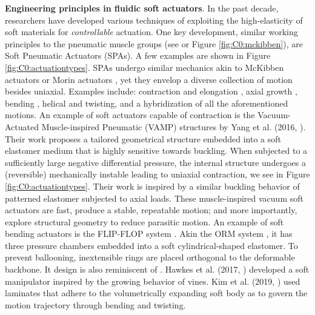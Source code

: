 \vspace{-4mm}
\textbf{Engineering principles in fluidic soft actuators}. In the past decade, researchers have developed various techniques of exploiting the high-elasticity of soft materials for \textit{controllable} actuation. One key development, similar working principles to the pneumatic muscle groups (see \cite{Mckibben,Morin1953} or Figure \ref{fig:C0:mckibben}), are Soft Pneumatic Actuators (SPAs). A few examples are shown in Figure \ref{fig:C0:actuationtypes}. SPAs undergo similar mechanics akin to McKibben actuators \cite{Mckibben} or Morin actuators \cite{Morin1953}, yet they envelop a diverse collection of motion besides uniaxial. Examples include: contraction and elongation \cite{Yang2016}, axial growth \cite{Hawkes2017}, bending \cite{Mosadegh2014,Galloway2016,Marchese2016}, helical and twisting, and a hybridization of all the aforementioned motions. An example of soft actuators capable of contraction is the Vacuum-Actuated Muscle-inspired Pneumatic (VAMP) structures by Yang et al. (2016, \cite{Yang2016}). Their work proposes a tailored geometrical structure embedded into a soft elastomer medium that is highly sensitive towards buckling. When subjected to a sufficiently large negative differential pressure, the internal structure undergoes a (reversible) mechanically instable leading to uniaxial contraction, we see in Figure \ref{fig:C0:actuationtypes}. Their work is inspired by a similar buckling behavior of patterned elastomer \cite{Bertoldi2008,Mullin2007,Shim2013Aug} subjected to axial loads. These muscle-inspired vacuum soft actuators are fast, produce a stable, repeatable motion; and more importantly, explore structural geometry to reduce parasitic motion. An example of soft bending actuators is the FLIP-FLOP system \cite{Cianchetti2013Nov}. Akin the ORM system \cite{BibEntryOrm2019Sep}, it has three pressure chambers embedded into a soft cylindrical-shaped elastomer. To prevent ballooning, inextensible rings are placed orthogonal to the deformable backbone. It design is also reminiscent of \cite{Suzumori1992,Suzumori1991}. Hawkes et al. (2017, \cite{Hawkes2017}) developed a soft manipulator inspired by the growing behavior of vines. Kim et al. (2019, \cite{Kim2019Aug}) used laminates that adhere to the volumetrically expanding soft body as to govern the motion trajectory through bending and twisting.

